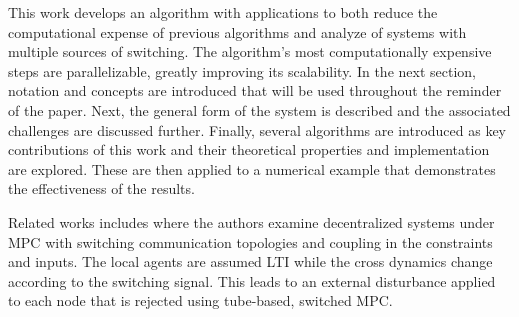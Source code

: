 This work develops an algorithm with applications to both reduce the computational expense of previous algorithms and analyze of systems with multiple sources of switching. The algorithm's most computationally expensive steps are parallelizable, greatly improving its scalability. In the next section, notation and concepts are introduced that will be used throughout the reminder of the paper. Next, the general form of the system is described and the associated challenges are discussed further. Finally, several algorithms are introduced as key contributions of this work and their theoretical properties and implementation are explored. These are then applied to a numerical example that demonstrates the effectiveness of the results. 

Related works includes \cite{Ahandani2020} where the authors examine decentralized systems under MPC with switching communication topologies and coupling in the constraints and inputs. The local agents are assumed LTI while the cross dynamics change according to the switching signal. This leads to an external disturbance applied to each node that is rejected using tube-based, switched MPC.